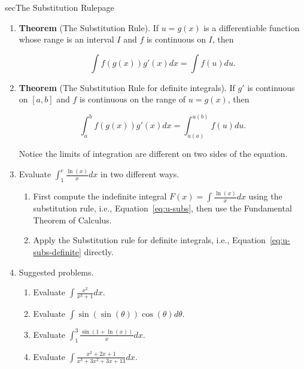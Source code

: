 \documentclass[../main]{subfiles}
\begin{document}
\begin{outline}{sec}{The Substitution Rule}{page} \label{outline:u-substitution}
  \begin{enumerate}
    \item \textbf{Theorem} (The Substitution Rule). If \(u = g(x)\) is a differentiable function whose range is an interval \(I\) and \(f\) is continuous on \(I\), then 
      \begin{mdframed}[style=simple]
        \begin{equation} \label{eq:u-subs}
          \int f(g(x)) g'(x) dx = \int f(u) du.
        \end{equation}
      \end{mdframed}

    \item \textbf{Theorem} (The Substitution Rule for definite integrals). If \(g'\) is continuous on \([a,b]\) and \(f\) is continuous on the range of \(u = g(x)\), then 
      \begin{mdframed}[style=simple]
        \begin{equation} \label{eq:u-subs-definite}
          \int_{a}^{b} f(g(x)) g'(x) dx = \int_{u(a)}^{u(b)} f(u) du.
        \end{equation}
      \end{mdframed}
      Notice the limits of integration are different on two sides of the equation.

    \item Evaluate \(\int_{1}^{e} \frac{\ln(x)}{x} dx\) in two different ways. 
      \begin{enumerate}
        \item First compute the indefinite integral \(F(x) = \int \frac{\ln(x)}{x} dx\) using the substitution rule, i.e., Equation~\eqref{eq:u-subs}, then use the Fundamental Theorem of Calculus.
        \item Apply the Substitution rule for definite integrals, i.e., Equation~\eqref{eq:u-subs-definite} directly.
      \end{enumerate}
    \item Suggested problems.
      \begin{enumerate}
      \item Evaluate \(\int \frac{x^{2}}{x^{3}+1} dx\).
      \item Evaluate \(\int \sin(\sin(\theta)) \cos(\theta) d \theta\).
      \item Evaluate \(\int_{1}^{3} \frac{\sin(1 + \ln(x))}{x} dx\).
      \item Evaluate \(\int \frac{x^{2} + 2x + 1}{x^{3} + 3 x^{2} + 3x + 13} dx\).
      \end{enumerate}
      

\end{enumerate}
\end{outline}
\end{document}

